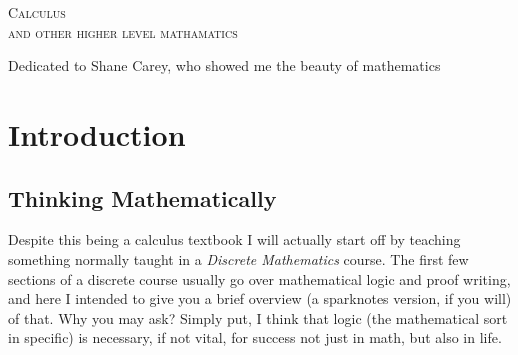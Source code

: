 \documentclass[addpoints]{exam}
\begin{document}
\begin{titlepage}
    \begin{tcolorbox}[valign=center]
        {\begin{center}
        \hspace{0pt}
        \vfill
        \fontsize{45}{45}\scshape Calculus\\ 
        \fontsize{30}{30}\scshape and other higher level mathamatics
        \vfill
        \hspace{0pt}
        \end{center}}
    \end{tcolorbox}
\end{titlepage}

\newpage

\begin{center}
  \thispagestyle{empty}
  \vspace*{\fill}
  Dedicated to Shane Carey, who showed me the beauty of mathematics
  \vspace*{\fill}
\end{center}

\newpage

\tableofcontents 

\newpage 

\section*{Introduction}
\subsection*{Thinking Mathematically}

Despite this being a calculus textbook I will actually start off by teaching something normally taught in a \textit{Discrete Mathematics} course. The first few sections of a discrete course usually go over mathematical logic and proof writing, and here I intended to give you a brief overview (a sparknotes version, if you will) of that. Why you may ask? Simply put, I think that logic (the mathematical sort in specific) is necessary, if not vital, for success not just in math, but also in life.

\end{document}
